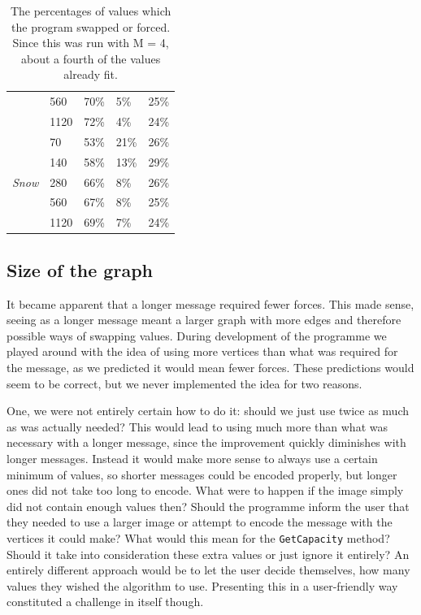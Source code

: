 \begin{table}[H]
{\begin{tabular}{@{}lllll@{}}
                                                & 560                     & 70\%           & 5\%             & 25\%                 \\
                                                & 1120                    & 72\%           & 4\%             & 24\%                 \\ \midrule
            \multirow{5}{*}{\textit{Snow}}      & 70                      & 53\%           & 21\%            & 26\%                 \\
                                                & 140                     & 58\%           & 13\%            & 29\%                 \\
                                                & 280                     & 66\%           & 8\%             & 26\%                 \\
                                                & 560                     & 67\%           & 8\%             & 25\%                 \\
                                                & 1120                    & 69\%           & 7\%             & 24\%                 \\ \bottomrule
        \end{tabular}
    }
    \caption{The percentages of values which the program swapped or forced. Since this was run with M = 4, about a fourth of the values already fit.}
    \label{fig:forces_swaps}
\end{table}

\subsection{Size of the graph}
It became apparent that a longer message required fewer forces. 
This made sense, seeing as a longer message meant a larger graph with more edges and therefore possible ways of swapping values.
During development of the programme we played around with the idea of using more vertices than what was required for the message, as we predicted it would mean fewer forces.
These predictions would seem to be correct, but we never implemented the idea for two reasons.

One, we were not entirely certain how to do it: should we just use twice as much as was actually needed?
This would lead to using much more than what was necessary with a longer message, since the improvement quickly diminishes with longer messages.
Instead it would make more sense to always use a certain minimum of values, so shorter messages could be encoded properly, but longer ones did not take too long to encode.
What were to happen if the image simply did not contain enough values then? 
Should the programme inform the user that they needed to use a larger image or attempt to encode the message with the vertices it could make?
What would this mean for the \lstinline|GetCapacity| method? 
Should it take into consideration these extra values or just ignore it entirely?
An entirely different approach would be to let the user decide themselves, how many values they wished the algorithm to use. 
Presenting this in a user-friendly way constituted a challenge in itself though.

